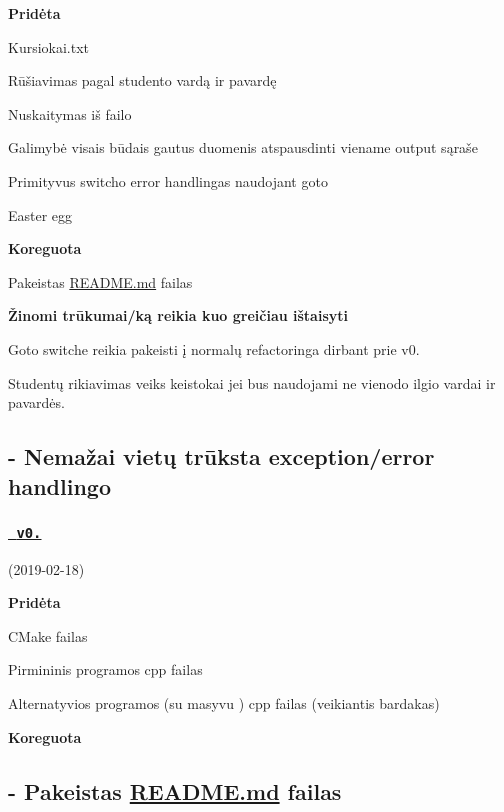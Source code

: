 {\bfseries{Pridėta}}
\begin{DoxyItemize}
\item Kursiokai.\+txt
\item Rūšiavimas pagal studento vardą ir pavardę
\item Nuskaitymas iš failo
\item Galimybė visais būdais gautus duomenis atspausdinti viename output sąraše
\item Primityvus switch\textquotesingle{}o error handling\textquotesingle{}as naudojant goto
\item Easter egg
\end{DoxyItemize}

{\bfseries{Koreguota}}
\begin{DoxyItemize}
\item Pakeistas \mbox{\hyperlink{_r_e_a_d_m_e_8md}{R\+E\+A\+D\+M\+E.\+md}} failas
\end{DoxyItemize}

{\bfseries{Žinomi trūkumai/ką reikia kuo greičiau ištaisyti}}
\begin{DoxyItemize}
\item Goto switche reikia pakeisti į normalų refactoringa dirbant prie v0.
\item Studentų rikiavimas veiks keistokai jei bus naudojami ne vienodo ilgio vardai ir pavardės. \subsection*{-\/ Nemažai vietų trūksta exception/error handling\textquotesingle{}o }
\end{DoxyItemize}

\subsubsection*{\href{https://github.com/gitguuddd/Obj_Duomenu_apdorojimas/releases/tag/v0.1}{\texttt{ v0.}}}

(2019-\/02-\/18)

{\bfseries{Pridėta}}
\begin{DoxyItemize}
\item C\+Make failas
\item Pirmininis programos {\ttfamily cpp} failas
\item Alternatyvios programos (su masyvu ) {\ttfamily cpp} failas (veikiantis bardakas)
\end{DoxyItemize}

{\bfseries{Koreguota}} \subsection*{-\/ Pakeistas \mbox{\hyperlink{_r_e_a_d_m_e_8md}{R\+E\+A\+D\+M\+E.\+md}} failas }

